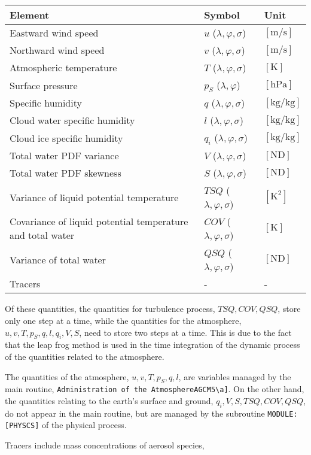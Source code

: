 \begin{longtable}[]{@{}lll@{}}
\toprule
Element & Symbol & Unit\tabularnewline
\midrule
\endhead
Eastward wind speed & \(u\) (\(\lambda,\varphi,\sigma\)) & \(\mathrm{[m/s]}\)\tabularnewline
Northward wind speed & \(v\) (\(\lambda,\varphi,\sigma\)) & \(\mathrm{[m/s]}\)\tabularnewline
Atmospheric temperature & \(T\) (\(\lambda,\varphi,\sigma\)) & \(\mathrm{[K]}\)\tabularnewline
Surface pressure & \(p_S\) (\(\lambda,\varphi\)) & \(\mathrm{[hPa]}\)\tabularnewline
Specific humidity & \(q\) (\(\lambda,\varphi,\sigma\)) & \(\mathrm{[kg/kg]}\)\tabularnewline
Cloud water specific humidity & \(l\) (\(\lambda,\varphi,\sigma\)) & \(\mathrm{[kg/kg]}\)\tabularnewline
Cloud ice specific humidity & \(q_i\) (\(\lambda,\varphi,\sigma\)) & \(\mathrm{[kg/kg]}\)\tabularnewline
Total water PDF variance & \(V\) (\(\lambda,\varphi,\sigma\)) & \(\mathrm{[ND]}\)\tabularnewline
Total water PDF skewness & \(S\) (\(\lambda,\varphi,\sigma\)) & \(\mathrm{[ND]}\)\tabularnewline
Variance of liquid potential temperature & \(TSQ\) (\(\lambda,\varphi,\sigma\)) & \(\mathrm{[K^2]}\)\tabularnewline
Covariance of liquid potential temperature and total water & \(COV\) (\(\lambda,\varphi,\sigma\)) & \(\mathrm{[K]}\)\tabularnewline
Variance of total water & \(QSQ\) (\(\lambda,\varphi,\sigma\)) & \(\mathrm{[ND]}\)\tabularnewline
Tracers & - & -\tabularnewline
\bottomrule
\end{longtable}

Of these quantities, the quantities for turbulence process, \(TSQ, COV, QSQ\), store only one step at a time, while the quantities for the atmosphere, \(u, v, T, p_S, q, l, q_i, V, S\), need to store
two steps at a time. This is due to the fact that the leap frog method is used in the time integration of the dynamic process of the quantities related to the atmosphere.

The quantities of the atmosphere, \(u, v, T, p_S, q, l\), are variables managed by the main routine, \texttt{Administration\ of\ the\ Atmosphere\textquotesingle{}{[}AGCM5\textbackslash{}a{]}}. On the
other hand, the quantities relating to the earth's surface and ground, \(q_i, V, S, TSQ, COV, QSQ\), do not appear in the main routine, but are managed by the subroutine \texttt{MODULE:{[}PHYSCS{]}}
of the physical process.

Tracers include mass concentrations of aerosol species,

